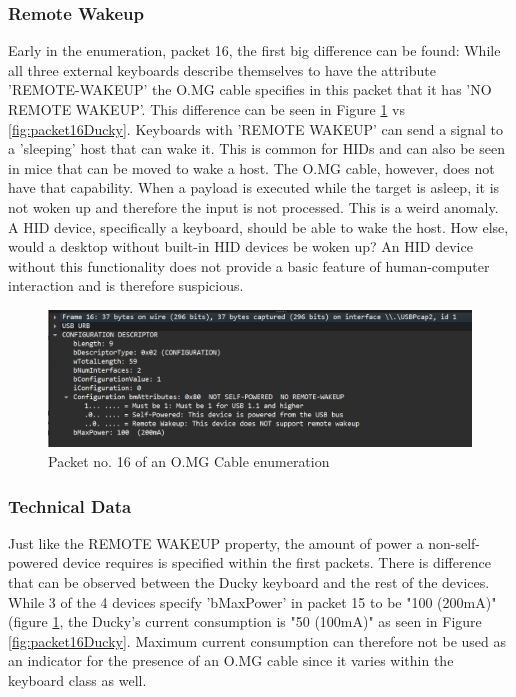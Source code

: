 \subsubsection{Remote Wakeup}

Early in the enumeration, packet 16, the first big difference can be found: While all three external keyboards describe themselves to have the attribute 'REMOTE-WAKEUP' the O.MG cable specifies in this packet that it has 'NO REMOTE WAKEUP'. This difference can be seen in Figure \ref{fig:packet16OMG} vs \ref{fig:packet16Ducky}. Keyboards with 'REMOTE WAKEUP' can send a signal to a 'sleeping' host that can wake it. This is common for HIDs and can also be seen in mice that can be moved to wake a host. The O.MG cable, however, does not have that capability. When a payload is executed while the target is asleep, it is not woken up and therefore the input is not processed. This is a weird anomaly. A HID device, specifically a keyboard, should be able to wake the host. How else, would a desktop without built-in HID devices be woken up? An HID device without this functionality does not provide a basic feature of human-computer interaction and is therefore suspicious.

\begin{figure}[H]
    \centering
    \includegraphics[width=0.75\linewidth]{visuals/no-remote-wakeup-100mA.png}
    \caption{Packet no. 16 of an O.MG Cable enumeration}
    \label{fig:packet16OMG}
\end{figure}

\subsubsection{Technical Data}

Just like the REMOTE WAKEUP property, the amount of power a non-self-powered device requires is specified within the first packets. There is difference that can be observed between the Ducky keyboard and the rest of the devices. While 3 of the 4 devices specify 'bMaxPower' in packet 15 to be "100 (200mA)" (figure \ref{fig:packet16OMG}, the Ducky's current consumption is "50 (100mA)" as seen in Figure \ref{fig:packet16Ducky}. Maximum current consumption can therefore not be used as an indicator for the presence of an O.MG cable since it varies within the keyboard class as well. 


